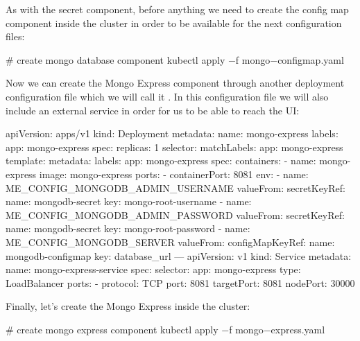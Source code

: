 As with the secret component, before anything we need to create the config map component inside the cluster in order
to be available for the next configuration files:

\begin{bash}
# create mongo database component
kubectl apply $-$f mongo$-$configmap.yaml
\end{bash}

Now we can create the Mongo Express component through another deployment configuration file which we will call it
. In this configuration file we will also include an external service in order for us to be
able to reach the UI:

\begin{block}
apiVersion: apps/v1
kind: Deployment
metadata:
  name: mongo-express
  labels:
    app: mongo-express
spec:
  replicas: 1
  selector:
    matchLabels:
      app: mongo-express
  template:
    metadata:
      labels:
        app: mongo-express
    spec:
      containers:
      - name: mongo-express
        image: mongo-express
        ports:
        - containerPort: 8081
        env:
        - name: ME_CONFIG_MONGODB_ADMIN_USERNAME
          valueFrom:
            secretKeyRef:
              name: mongodb-secret
              key: mongo-root-username
        - name: ME_CONFIG_MONGODB_ADMIN_PASSWORD
          valueFrom:
            secretKeyRef:
              name: mongodb-secret
              key: mongo-root-password
        - name: ME_CONFIG_MONGODB_SERVER
          valueFrom:
            configMapKeyRef:
              name: mongodb-configmap
              key: database_url
---
apiVersion: v1
kind: Service
metadata:
  name: mongo-express-service
spec:
  selector:
    app: mongo-express
  type: LoadBalancer
  ports:
    - protocol: TCP
      port: 8081
      targetPort: 8081
      nodePort: 30000
\end{block}

Finally, let's create the Mongo Express inside the cluster:

\begin{bash}
# create mongo express component
kubectl apply $-$f mongo$-$express.yaml
\end{bash}